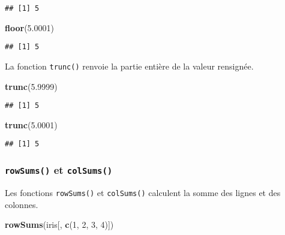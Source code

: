 \documentclass[]{book}
\newenvironment{Shaded}{\begin{snugshade}}{\end{snugshade}}
\newcommand{\KeywordTok}[1]{\textcolor[rgb]{0.13,0.29,0.53}{\textbf{#1}}}
\newcommand{\DecValTok}[1]{\textcolor[rgb]{0.00,0.00,0.81}{#1}}
\newcommand{\FloatTok}[1]{\textcolor[rgb]{0.00,0.00,0.81}{#1}}
\newcommand{\NormalTok}[1]{#1}
\theoremstyle{definition}
\theoremstyle{definition}
\theoremstyle{definition}
\theoremstyle{remark}
\begin{document}
\begin{verbatim}
## [1] 5
\end{verbatim}

\begin{Shaded}
\begin{Highlighting}[]
\KeywordTok{floor}\NormalTok{(}\FloatTok{5.0001}\NormalTok{)}
\end{Highlighting}
\end{Shaded}

\begin{verbatim}
## [1] 5
\end{verbatim}

La fonction \texttt{trunc()} renvoie la partie entière de la valeur
rensignée.

\begin{Shaded}
\begin{Highlighting}[]
\KeywordTok{trunc}\NormalTok{(}\FloatTok{5.9999}\NormalTok{)}
\end{Highlighting}
\end{Shaded}

\begin{verbatim}
## [1] 5
\end{verbatim}

\begin{Shaded}
\begin{Highlighting}[]
\KeywordTok{trunc}\NormalTok{(}\FloatTok{5.0001}\NormalTok{)}
\end{Highlighting}
\end{Shaded}

\begin{verbatim}
## [1] 5
\end{verbatim}

\subsubsection{\texorpdfstring{\texttt{rowSums()} et
\texttt{colSums()}}{rowSums() et colSums()}}\label{l015rowsums}

Les fonctions \texttt{rowSums()} et \texttt{colSums()} calculent la
somme des lignes et des colonnes.

\begin{Shaded}
\begin{Highlighting}[]
\KeywordTok{rowSums}\NormalTok{(iris[, }\KeywordTok{c}\NormalTok{(}\DecValTok{1}\NormalTok{, }\DecValTok{2}\NormalTok{, }\DecValTok{3}\NormalTok{, }\DecValTok{4}\NormalTok{)])}
\end{Highlighting}
\end{Shaded}
\end{document}
